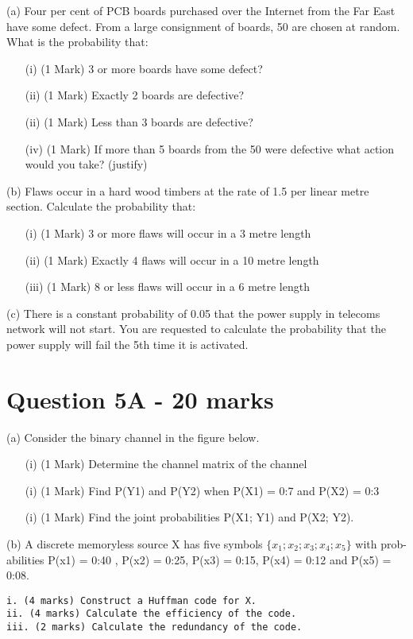 \documentclass[]{article}
\begin{document}
(a)  	Four  per cent of PCB boards purchased over the Internet from the Far East have some defect.  
From a large consignment of boards, 50 are chosen at random.  
What is the probability that:
\begin{itemize}
\item[(i)] (1 Mark) 	3 or more boards have some defect?
\item[(ii)] (1 Mark) 	Exactly 2 boards are defective?
\item[(ii)] (1 Mark) 	Less than 3 boards are defective?
\item[(iv)] (1 Mark) 	If more than 5 boards from the 50 were defective what action would you take? (justify)
\end{itemize} 
(b) 	Flaws occur in a hard wood timbers  at the rate of 1.5 per linear  metre section.  Calculate the probability that:
\begin{itemize}
\item[(i)] (1 Mark) 	3 or more flaws will occur in a 3  metre length 
\item[(ii)] (1 Mark) 	Exactly 4 flaws will occur in a 10 metre length
\item[(iii)] (1 Mark) 	8 or less flaws will occur in a 6  metre length 
\end{itemize} 

(c)	There is a constant probability of 0.05  that the power supply in telecoms network will not start.  
You are requested to calculate the probability that the power supply will fail the 5th time it is activated.

\newpage
\section*{Question 5A - 20 marks}
(a) Consider the binary channel in the figure below.

\begin{itemize}
\item[(i)] (1 Mark) Determine the channel matrix of the channel
\item[(i)] (1 Mark)  Find P(Y1) and P(Y2) when P(X1) = 0:7 and P(X2) = 0:3
\item[(i)] (1 Mark)  Find the joint probabilities P(X1; Y1) and P(X2; Y2).
\end{itemize}
(b) A discrete memoryless source X has five symbols $\{x_1; x_2; x_3; x_4; x_5\}$ with prob-
abilities P(x1) = 0:40 , P(x2) = 0:25, P(x3) = 0:15, P(x4) = 0:12 and
P(x5) = 0:08.
\begin{verbatim}
i. (4 marks) Construct a Huffman code for X.
ii. (4 marks) Calculate the efficiency of the code.
iii. (2 marks) Calculate the redundancy of the code.
\end{verbatim}
\end{document}
